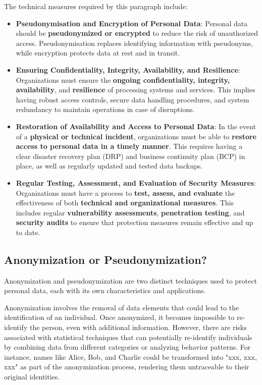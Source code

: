 The technical measures required by this paragraph include:
\begin{itemize}
  \item \textbf{Pseudonymisation and Encryption of Personal Data}:
    Personal data should be \textbf{pseudonymized or encrypted} to
    reduce the risk of unauthorized access. Pseudonymisation replaces
    identifying information with pseudonyms, while encryption protects
    data at rest and in transit.  
  \item \textbf{Ensuring Confidentiality, Integrity, Availability, and
    Resilience}:  Organizations must ensure the \textbf{ongoing
    confidentiality, integrity, availability}, and \textbf{resilience}
    of processing systems and services. This implies having robust
    access controls, secure data handling procedures, and system
    redundancy to maintain operations in case of disruptions.  
  \item \textbf{Restoration of Availability and Access to Personal
    Data}:  In the event of a \textbf{physical or technical incident},
    organizations must be able to \textbf{restore access to personal
    data in a timely manner}. This requires having a clear disaster
    recovery plan (DRP) and business continuity plan (BCP) in place,
    as well as regularly updated and tested data backups.  
  \item \textbf{Regular Testing, Assessment, and Evaluation of
    Security Measures}:  Organizations must have a process to
    \textbf{test, assess, and evaluate} the effectiveness of both
    \textbf{technical and organizational measures}. This includes
    regular \textbf{vulnerability assessments}, \textbf{penetration
    testing}, and \textbf{security audits} to ensure that protection
    measures remain effective and up to date.  
\end{itemize}

\subsection{Anonymization or Pseudonymization?}

Anonymization and pseudonymization are two distinct techniques used to
protect personal data, each with its own characteristics and
applications.

Anonymization involves the removal of data elements that could lead to
the identification of an individual. Once anonymized, it becomes
impossible to re-identify the person, even with additional
information. However, there are risks associated with statistical
techniques that can potentially re-identify individuals by combining
data from different categories or analyzing behavior patterns. For
instance, names like Alice, Bob, and Charlie could be transformed into
"xxx, xxx, xxx" as part of the anonymization process, rendering them
untraceable to their original identities.

